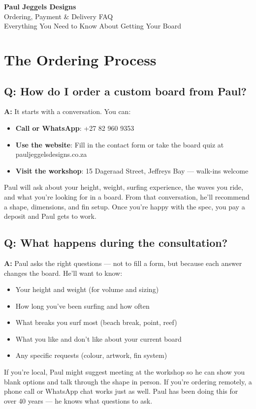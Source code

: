 \documentclass[11pt,a4paper]{article}
\newcommand{\question}[1]{\subsection*{Q: #1}}
\newcommand{\answer}{\noindent\textbf{A:} }
\begin{document}
\begin{center}
{\LARGE\bfseries\color{pjdnavy} Paul Jeggels Designs}\\[6pt]
{\Large\color{pjdnavy} Ordering, Payment \& Delivery FAQ}\\[4pt]
{\small\color{gray} Everything You Need to Know About Getting Your Board}
\end{center}

\vspace{1em}

\section{The Ordering Process}

\question{How do I order a custom board from Paul?}
\answer It starts with a conversation. You can:
\begin{itemize}[leftmargin=1.5em]
    \item \textbf{Call or WhatsApp}: +27 82 960 9353
    \item \textbf{Use the website}: Fill in the contact form or take the board quiz at pauljeggelsdesigns.co.za
    \item \textbf{Visit the workshop}: 15 Dageraad Street, Jeffreys Bay --- walk-ins welcome
\end{itemize}
Paul will ask about your height, weight, surfing experience, the waves you ride, and what you're looking for in a board. From that conversation, he'll recommend a shape, dimensions, and fin setup. Once you're happy with the spec, you pay a deposit and Paul gets to work.

\question{What happens during the consultation?}
\answer Paul asks the right questions --- not to fill a form, but because each answer changes the board. He'll want to know:
\begin{itemize}[leftmargin=1.5em]
    \item Your height and weight (for volume and sizing)
    \item How long you've been surfing and how often
    \item What breaks you surf most (beach break, point, reef)
    \item What you like and don't like about your current board
    \item Any specific requests (colour, artwork, fin system)
\end{itemize}
If you're local, Paul might suggest meeting at the workshop so he can show you blank options and talk through the shape in person. If you're ordering remotely, a phone call or WhatsApp chat works just as well. Paul has been doing this for over 40 years --- he knows what questions to ask.
\end{document}
